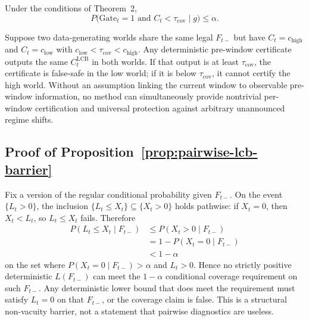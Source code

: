 \begin{corollary}
\label{cor:false-safe-gate}
Under the conditions of Theorem~2,
\begin{equation}
 P\bigl(\mathrm{Gate}_t=1\text{ and }C_t<\tau_{\mathrm{cov}}\mid g\bigr)
 \le\alpha.
 \label{eq:agg_cor2}
\end{equation}
\end{corollary}

\begin{proposition}
\label{prop:drift-boundary}
Suppose two data-generating worlds share the same legal $F_{t-}$ but have
$C_t=c_{\mathrm{high}}$ and $C_t=c_{\mathrm{low}}$ with
$c_{\mathrm{low}}<\tau_{\mathrm{cov}}<c_{\mathrm{high}}$.  Any deterministic
pre-window certificate outputs the same $C^{\mathrm{LCB}}_t$ in both worlds.
If that output is at least $\tau_{\mathrm{cov}}$, the certificate is
false-safe in the low world; if it is below $\tau_{\mathrm{cov}}$, it cannot
certify the high world.  Without an assumption linking the current window to
observable pre-window information, no method can simultaneously provide
nontrivial per-window certification and universal protection against
arbitrary unannounced regime shifts.
\end{proposition}

\subsection{Proof of Proposition~\ref{prop:pairwise-lcb-barrier}}
\label{app:proof_pairwise_lcb}

Fix a version of the regular conditional probability given $F_{t-}$.  On the
event $\{L_t>0\}$, the inclusion $\{L_t\le X_t\}\subseteq\{X_t>0\}$ holds
pathwise: if $X_t=0$, then $X_t<L_t$, so $L_t\le X_t$ fails.  Therefore
\begin{align*}
P(L_t\le X_t\mid F_{t-})
&\le
P(X_t>0\mid F_{t-}) \\
&=
1-P(X_t=0\mid F_{t-}) \\
&<
1-\alpha
\end{align*}
on the set where $P(X_t=0\mid F_{t-})>\alpha$ and $L_t>0$.  Hence no strictly
positive deterministic $L(F_{t-})$ can meet the $1-\alpha$ conditional coverage
requirement on such $F_{t-}$.  Any deterministic lower bound that does meet
the requirement must satisfy $L_t=0$ on that $F_{t-}$, or the coverage claim
is false.  This is a structural non-vacuity barrier, not a statement that
pairwise diagnostics are useless.

